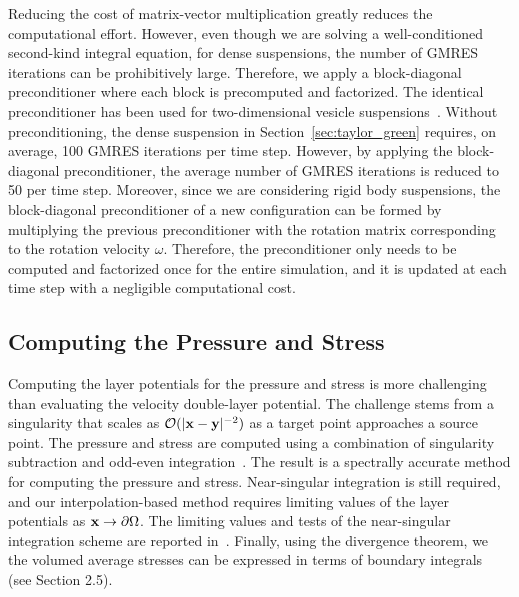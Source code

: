 \documentclass[AMA,STIX1COL]{WileyNJD-v2}
\begin{document}
Reducing the cost of matrix-vector multiplication greatly reduces the
computational effort.  However, even though we are solving a
well-conditioned second-kind integral equation, for dense suspensions,
the number of GMRES iterations can be prohibitively large.  Therefore,
we apply a block-diagonal preconditioner where each block is precomputed
and factorized.  The identical preconditioner has been used for
two-dimensional vesicle suspensions~\cite{Quaife2014}.  Without
preconditioning, the dense suspension in Section~\ref{sec:taylor_green}
requires, on average, 100 GMRES iterations per time step. However, by
applying the block-diagonal preconditioner, the average number of GMRES
iterations is reduced to 50 per time step.  Moreover, since we are
considering rigid body suspensions, the block-diagonal preconditioner of
a new configuration can be formed by multiplying the previous
preconditioner with the rotation matrix corresponding to the rotation
velocity $\omega$.  Therefore, the preconditioner only needs to be
computed and factorized once for the entire simulation, and it is
updated at each time step with a negligible computational cost.


\subsection{Computing the Pressure and Stress}
\label{sec:pressure_stress}
Computing the layer potentials for the pressure and stress is more
challenging than evaluating the velocity double-layer potential.  The
challenge stems from a singularity that scales as $\mathcal{O}(|{\mathbf{x}} -
{\mathbf{y}}|^{-2})$ as a target point approaches a source point.  The pressure
and stress are computed using a combination of singularity subtraction
and odd-even integration~\cite{sid-isr1988}.  The result is a spectrally
accurate method for computing the pressure and stress.  Near-singular
integration is still required, and our interpolation-based method
requires limiting values of the layer potentials as ${\mathbf{x}} \rightarrow
{\partial}\Omega$.  The limiting values and tests of the near-singular
integration scheme are reported in~\cite{Quaife2014}.  Finally, using
the divergence theorem, we the volumed average stresses can be expressed
in terms of boundary integrals~\cite{Pozrikidis1992} (see Section 2.5).

\end{document}
